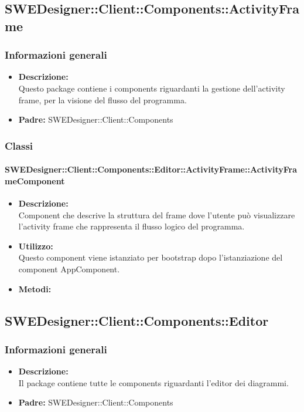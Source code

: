 	\subsection{SWEDesigner::Client::Components::ActivityFrame}
		\subsubsection{Informazioni generali}
			\begin{itemize}
          		\item \textbf{Descrizione:}\\
          		Questo package contiene i components riguardanti la gestione dell’activity frame, per la visione del flusso del programma.
          		\item \textbf{Padre:} SWEDesigner::Client::Components
          	\end{itemize}
		\subsubsection{Classi}
			\paragraph{SWEDesigner::Client::Components::Editor::ActivityFrame::ActivityFrameComponent}
				\begin{itemize}
          			\item \textbf{Descrizione:}\\
          			Component che descrive la struttura del frame dove l’utente può visualizzare l’activity frame che rappresenta il flusso logico del programma.
          			\item \textbf{Utilizzo:}\\
          			Questo component viene istanziato per bootstrap dopo l’istanziazione del component AppComponent.
          			\item \textbf{Metodi:}\\
          		\end{itemize}
	\subsection{SWEDesigner::Client::Components::Editor}
		\subsubsection{Informazioni generali}
			\begin{itemize}
          		\item \textbf{Descrizione:}\\
          		Il package contiene tutte le components riguardanti l’editor dei diagrammi.
          		\item \textbf{Padre:} SWEDesigner::Client::Components
          	\end{itemize}

